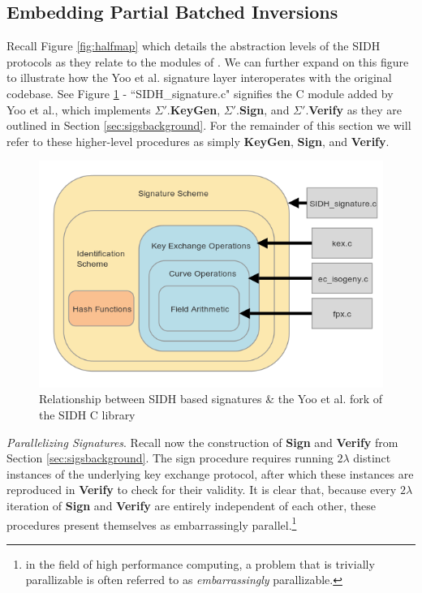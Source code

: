 \subsection{Embedding Partial Batched Inversions}

Recall Figure \ref{fig:halfmap} which details the abstraction levels of the SIDH protocols as they relate to the modules of \sidh. We can further expand on this figure to illustrate how the Yoo et al. signature layer interoperates with the original \sidh codebase. See Figure \ref{fig:fullmap} - ``SIDH\_signature.c" signifies the C module added by Yoo et al., which implements $\Sigma'$.\textbf{KeyGen}, $\Sigma'$.\textbf{Sign}, and $\Sigma'$.\textbf{Verify} as they are outlined in Section \ref{sec:sigsbackground}. For the remainder of this section we will refer to these higher-level procedures as simply \textbf{KeyGen}, \textbf{Sign}, and \textbf{Verify}.

\begin{figure}[htp]
\centering
\includegraphics[scale=0.7]{fullmapwcurve.png} %
\caption{Relationship between SIDH based signatures \& the Yoo et al. fork of the SIDH C library}
\label{fig:fullmap} %
\end{figure}

\noindent
\emph{Parallelizing Signatures}. Recall now the construction of \textbf{Sign} and \textbf{Verify} from Section \ref{sec:sigsbackground}. The sign procedure requires running $2\lambda$ distinct instances of the underlying key exchange protocol, after which these instances are reproduced in \textbf{Verify} to check for their validity. It is clear that, because every $2\lambda$ iteration of \textbf{Sign} and \textbf{Verify} are entirely independent of each other, these procedures present themselves as embarrassingly parallel.\footnote{in the field of high performance computing, a problem that is trivially parallizable is often referred to as \emph{embarrassingly} parallizable.}

